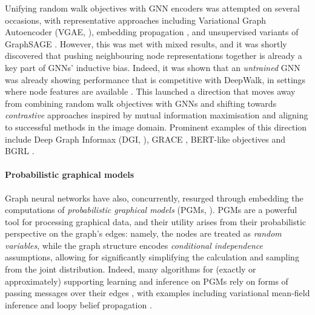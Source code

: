 Unifying random walk objectives with GNN encoders was attempted on several occasions, with representative approaches including Variational Graph Autoencoder (VGAE,  \cite{kipf2016variational}), embedding propagation \citep{garcia2017learning}, and unsupervised variants of GraphSAGE \citep{hamilton2017inductive}. However, this was met with mixed results, and it was shortly discovered that pushing neighbouring node representations together is already a key part of GNNs' inductive bias. Indeed, it was shown that an \emph{untrained} GNN was already showing performance that is competitive with DeepWalk, in settings where node features are available \citep{velickovic2019deep,wu2019simplifying}. This launched a direction that moves away from combining random walk objectives with GNNs and shifting towards \emph{contrastive} approaches inspired by mutual information maximisation and aligning to successful methods in the image domain. Prominent examples of this direction include Deep Graph Informax (DGI,  \cite{velickovic2019deep}), GRACE \citep{zhu2020deep}, BERT-like objectives \citep{hu2020strategies} and BGRL \citep{thakoor2021bootstrapped}.

\paragraph{Probabilistic graphical models} 
Graph neural networks have also, concurrently, resurged through embedding the computations of \emph{probabilistic graphical models} (PGMs, \cite{wainwright2008graphical}).
%
PGMs are a powerful tool for processing graphical data, and their utility arises from their probabilistic perspective on the graph's edges: namely, the nodes are treated as \emph{random variables}, while the graph structure encodes \emph{conditional independence} assumptions, allowing for significantly simplifying the calculation and sampling from the joint distribution. Indeed, many algorithms for (exactly or approximately) supporting learning and inference on PGMs rely on forms of passing messages over their edges \citep{pearl2014probabilistic}, with examples including variational mean-field inference and loopy belief propagation \citep{yedidia2001bethe,murphy2013loopy}.

